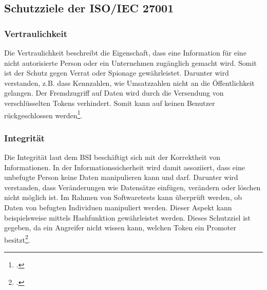 \subsection{Schutzziele der ISO/IEC 27001}
\subsubsection{Vertraulichkeit}
Die Vertraulichkeit beschreibt die Eigenschaft, dass eine Information für eine nicht autorisierte Person oder ein Unternehmen zugänglich gemacht wird. Somit ist der Schutz gegen Verrat oder Spionage gewährleistet. Darunter wird verstanden, z.B. dass Kennzahlen, wie Umsatzzahlen nicht an die Öffentlichkeit gelangen. 
Der Fremdzugriff auf Daten wird durch die Versendung von verschlüsselten Tokens verhindert. Somit kann auf keinen Benutzer rückgeschlossen werden\footcite{Lehrunterlagen-HTL-cloud}.


\subsubsection{Integrität}
Die Integrität laut dem BSI beschäftigt sich mit der Korrektheit von Informationen. In der Informationssicherheit wird damit assoziiert, dass eine unbefugte Person keine Daten manipulieren kann und darf. Darunter wird verstanden, dass Veränderungen wie Datensätze einfügen, verändern oder löschen nicht möglich ist.
Im Rahmen von Softwaretests kann überprüft werden, ob Daten von befugten Individuen manipuliert werden. Dieser Aspekt kann beispielsweise mittels Hashfunktion gewährleistet werden.
Dieses Schutzziel ist gegeben, da ein Angreifer nicht wissen kann, welchen Token ein Promoter besitzt\footcite{Lehrunterlagen-HTL-cloud}.

